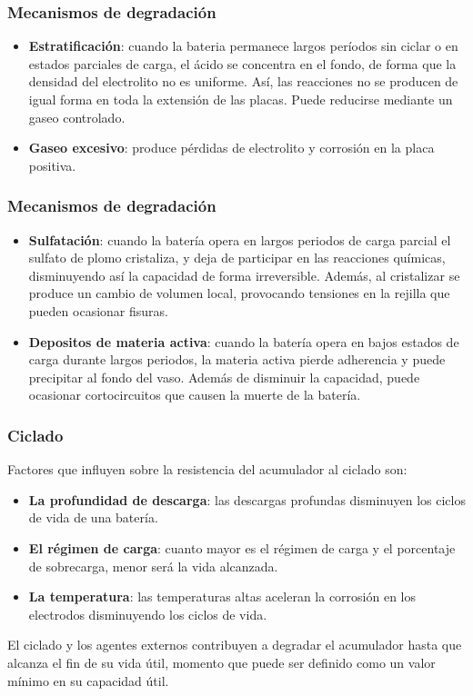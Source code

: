 \documentclass[serif, xcolor=dvipsnames]{beamer}
\begin{document}
\begin{frame}
\frametitle{Mecanismos de degradación}
\begin{itemize}
\item \textbf{Estratificación}: cuando la bateria permanece largos períodos
sin ciclar o en estados parciales de carga, el ácido se concentra
en el fondo, de forma que la densidad del electrolito no es uniforme.
Así, las reacciones no se producen de igual forma en toda la extensión
de las placas. Puede reducirse mediante un gaseo controlado.
\item \textbf{Gaseo excesivo}: produce pérdidas de electrolito y corrosión
en la placa positiva.
\end{itemize}

\end{frame}

\begin{frame}
\frametitle{Mecanismos de degradación}
\begin{itemize}
\item \textbf{Sulfatación}: cuando la batería opera en largos periodos de
carga parcial el sulfato de plomo cristaliza, y deja de participar
en las reacciones químicas, disminuyendo así la capacidad de forma
irreversible. Además, al cristalizar se produce un cambio de volumen
local, provocando tensiones en la rejilla que pueden ocasionar fisuras.
\item \textbf{Depositos de materia activa}: cuando la batería opera en bajos
estados de carga durante largos periodos, la materia activa pierde
adherencia y puede precipitar al fondo del vaso. Además de disminuir
la capacidad, puede ocasionar cortocircuitos que causen la muerte
de la batería.
\end{itemize}

\end{frame}

\begin{frame}
\frametitle{Ciclado}

Factores que influyen sobre la resistencia del acumulador al ciclado
son:
\begin{itemize}
\item \textbf{La profundidad de descarga}: las descargas profundas disminuyen
los ciclos de vida de una batería.
\item \textbf{El régimen de carga}: cuanto mayor es el régimen de carga
y el porcentaje de sobrecarga, menor será la vida alcanzada.
\item \textbf{La temperatura}: las temperaturas altas aceleran la corrosión
en los electrodos disminuyendo los ciclos de vida.
\end{itemize}
El ciclado y los agentes externos contribuyen a degradar el acumulador
hasta que alcanza el fin de su vida útil, momento que puede ser definido
como un valor mínimo en su capacidad útil.


\end{frame}
\end{document}
